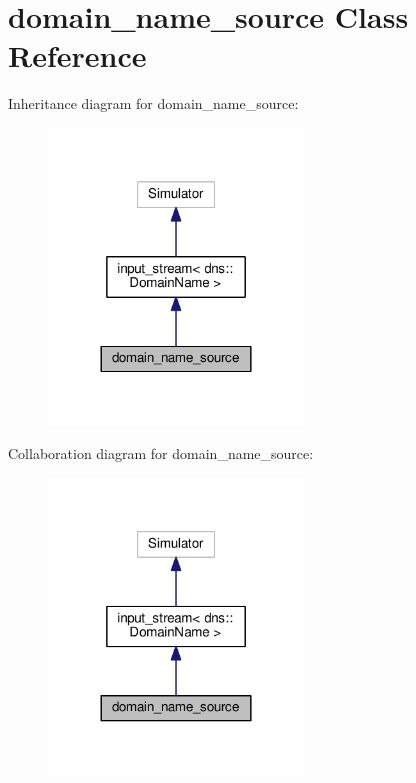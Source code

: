 \hypertarget{classdomain__name__source}{}\section{domain\+\_\+name\+\_\+source Class Reference}
\label{classdomain__name__source}


Inheritance diagram for domain\+\_\+name\+\_\+source\+:
\nopagebreak
\begin{figure}[H]
\begin{center}
\leavevmode
\includegraphics[width=192pt]{classdomain__name__source__inherit__graph}
\end{center}
\end{figure}


Collaboration diagram for domain\+\_\+name\+\_\+source\+:
\nopagebreak
\begin{figure}[H]
\begin{center}
\leavevmode
\includegraphics[width=192pt]{classdomain__name__source__coll__graph}
\end{center}
\end{figure}

